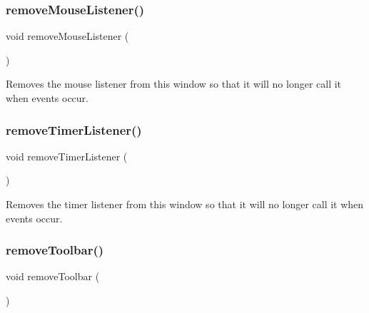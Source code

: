 \subsubsection{\texorpdfstring{remove\+Mouse\+Listener()}{removeMouseListener()}}
{\footnotesize\ttfamily void remove\+Mouse\+Listener (\begin{DoxyParamCaption}{ }\end{DoxyParamCaption})\hspace{0.3cm}{\ttfamily [virtual]}}



Removes the mouse listener from this window so that it will no longer call it when events occur. 

\mbox{\label{classsgl_1_1GWindow_a8ca9bf0f8dfd3755d73d07ee01e3455f}} 
\subsubsection{\texorpdfstring{remove\+Timer\+Listener()}{removeTimerListener()}}
{\footnotesize\ttfamily void remove\+Timer\+Listener (\begin{DoxyParamCaption}{ }\end{DoxyParamCaption})\hspace{0.3cm}{\ttfamily [virtual]}}



Removes the timer listener from this window so that it will no longer call it when events occur. 

\mbox{\label{classsgl_1_1GWindow_a3d1c6ae17962b89115a4bf1c2f6142eb}} 
\subsubsection{\texorpdfstring{remove\+Toolbar()}{removeToolbar()}}
{\footnotesize\ttfamily void remove\+Toolbar (\begin{DoxyParamCaption}{ }\end{DoxyParamCaption})\hspace{0.3cm}{\ttfamily [virtual]}}



